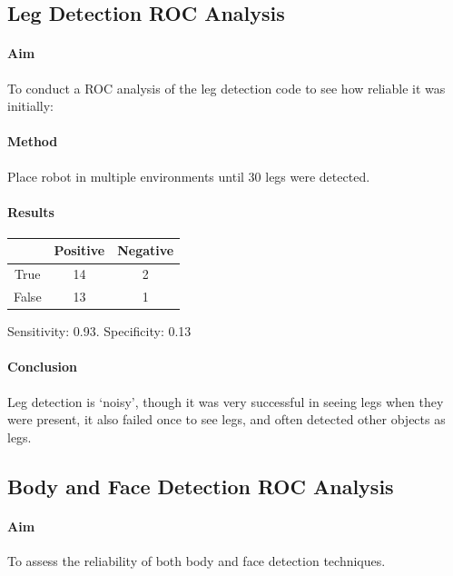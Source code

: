 \subsection{Leg Detection ROC Analysis}

\paragraph{Aim}

To conduct a ROC analysis of the leg detection code to see how reliable it was initially:

\paragraph{Method}

Place robot in multiple environments until 30 legs were detected.

\paragraph{Results}

\begin{center}
\begin{tabular}{ |c|c|c| } 
 \hline
 & Positive & Negative \\
 \hline
 True & 14 & 2 \\
 False & 13 & 1 \\
 \hline
\end{tabular}
\end{center}

Sensitivity: 0.93. Specificity: 0.13

\paragraph{Conclusion}

Leg detection is ‘noisy’, though it was very successful in seeing legs when they were present, it also failed once to see legs, and often detected other objects as legs.

\subsection{Body and Face Detection ROC Analysis}

\paragraph{Aim}

To assess the reliability of both body and face detection techniques.

